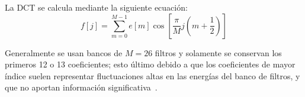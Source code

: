 La DCT se calcula mediante la siguiente ecuación:
\begin{equation}
    \label{eq:DCT}
    f[j] = \sum_{m=0}^{M-1}{e[m]\cos{\left[ \frac{\pi}{M}j\left( m + \frac{1}{2} \right) \right]}}
\end{equation}

Generalmente se usan bancos de $M=26$ filtros y solamente se conservan los primeros 12 o 13 coeficientes;
esto último debido a que los coeficientes de mayor índice suelen representar fluctuaciones altas en las energías del banco de filtros, y que no aportan información significativa~\cite{Davis80}.

